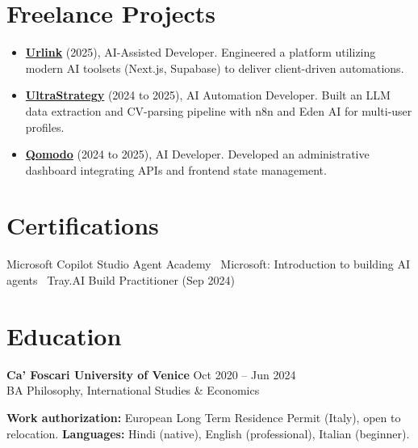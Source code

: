 \documentclass[a4paper,10pt]{article}
\begin{document}
\section{Freelance Projects}
\begin{itemize}
 \item \textbf{\href{https://smarturlink.com/}{Urlink}} (2025), AI-Assisted Developer. Engineered a platform utilizing modern AI toolsets (Next.js, Supabase) to deliver client-driven automations.
 \item \textbf{\href{https://ultrastrategy.com}{UltraStrategy}} (2024 to 2025), AI Automation Developer. Built an LLM data extraction and CV-parsing pipeline with n8n and Eden AI for multi-user profiles.
 \item \textbf{\href{https://www.qomodo.me/}{Qomodo}} (2024 to 2025), AI Developer. Developed an administrative dashboard integrating APIs and frontend state management.
\end{itemize}

\section{Certifications}
Microsoft Copilot Studio Agent Academy \textbullet\ Microsoft: Introduction to building AI agents \textbullet\ Tray.AI Build Practitioner (Sep 2024)

\section{Education}
\textbf{Ca' Foscari University of Venice} \hfill Oct 2020 -- Jun 2024\\
BA Philosophy, International Studies \& Economics

\vspace{2pt}
{\small \textbf{Work authorization:} European Long Term Residence Permit (Italy), open to relocation. \quad \textbf{Languages:} Hindi (native), English (professional), Italian (beginner).}
\end{document}
